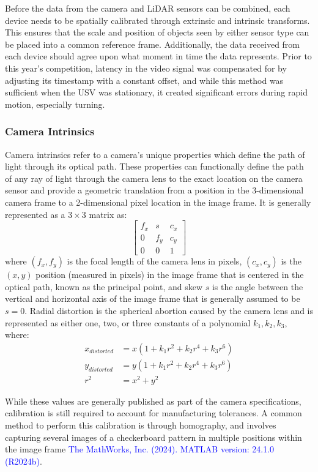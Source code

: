 Before the data from the camera and LiDAR sensors can be combined, each device needs to be spatially calibrated through extrinsic and intrinsic transforms. 
This ensures that the scale and position of objects seen by either sensor type can be placed into a common reference frame. 
Additionally, the data received from each device should agree upon what moment in time the data represents. 
Prior to this year's competition, latency in the video signal was compensated for by adjusting its timestamp with a constant offset, and while this method was sufficient when the USV was stationary, it created significant errors during rapid motion, especially turning.

\subsubsection{Camera Intrinsics}

Camera intrinsics refer to a camera's unique properties which define the path of light through its optical path.
These properties can functionally define the path of any ray of light through the camera lens to the exact location on the camera sensor and provide a geometric translation from a position in the 3-dimensional camera frame to a 2-dimensional pixel location in the image frame. 
It is generally represented as a $3 \times 3$ matrix as:
$$
\begin{bmatrix}
    f_x & s & c_x \\
    0 & f_y & c_y \\
    0 & 0 & 1
\end{bmatrix}
$$
where $(f_x, f_y)$ is the focal length of the camera lens in pixels, $(c_x, c_y)$ is the $(x,y)$ position (measured in pixels) in the image frame that is centered in the optical path, known as the principal point, and skew $s$ is the angle between the vertical and horizontal axis of the image frame that is generally assumed to be $s = 0$. 
Radial distortion is the spherical abortion caused by the camera lens and is represented as either one, two, or three constants of a polynomial $k_1,k_2,k_3$, where:
\begin{align*}
x_{distorted} & = x(1+k_1r^2+k_2r^4+k_3r^6)\\
y_{distorted} & = y(1+k_1r^2+k_2r^4+k_3r^6)\\
r^2 & = x^2+y^2
\end{align*}

While these values are generally published as part of the camera specifications, calibration is still required to account for manufacturing tolerances. A common method to perform this calibration is through homography, and involves capturing several images of a checkerboard pattern in multiple positions within the image frame \textcolor{blue}{The MathWorks, Inc. (2024). MATLAB version: 24.1.0 (R2024b)}.

